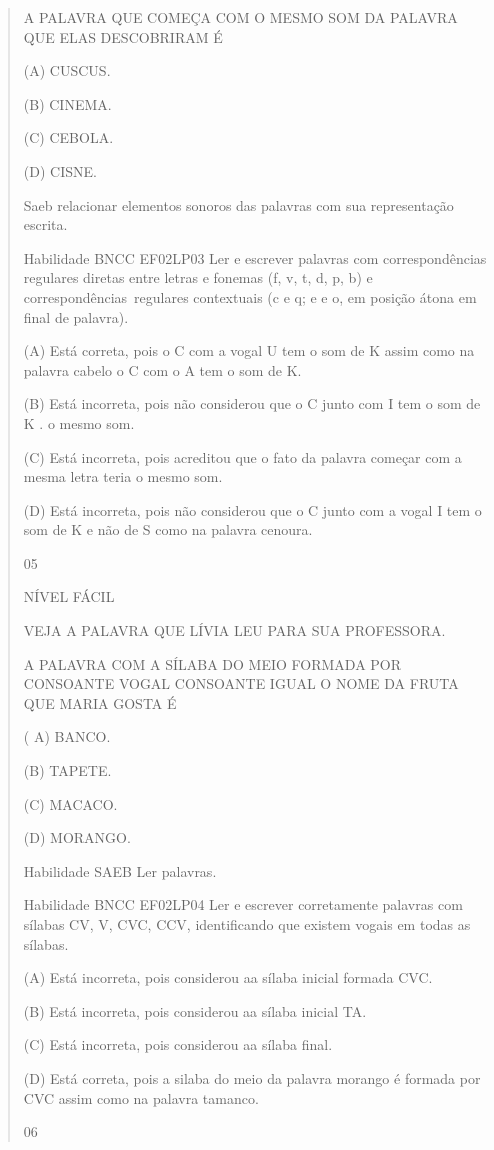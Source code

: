 \begin{verse}
{{{{{{{{{{{{{{{{{{{{A PALAVRA QUE COMEÇA COM O MESMO SOM DA PALAVRA QUE ELAS DESCOBRIRAM É

(A) CUSCUS.

(B) CINEMA.

(C) CEBOLA.

(D) CISNE.

Saeb relacionar elementos sonoros das palavras com sua representação
escrita.

Habilidade BNCC EF02LP03 Ler e escrever palavras com correspondências
regulares diretas entre letras e fonemas (f, v, t, d, p, b) e
correspondências~regulares contextuais (c e q; e e o, em posição átona
em final de palavra).

(A) Está correta, pois o C com a vogal U tem o som de K assim como na
palavra cabelo o C com o A tem o som de K.

(B) Está incorreta, pois não considerou que o C junto com I tem o som de
K . o mesmo som.

(C) Está incorreta, pois acreditou que o fato da palavra começar com a
mesma letra teria o mesmo som.

(D) Está incorreta, pois não considerou que o C junto com a vogal I tem
o som de K e não de S como na palavra cenoura.

\num{05}

NÍVEL FÁCIL

VEJA A PALAVRA QUE LÍVIA LEU PARA SUA PROFESSORA.

A PALAVRA COM A SÍLABA DO MEIO FORMADA POR CONSOANTE VOGAL CONSOANTE
IGUAL O NOME DA FRUTA QUE MARIA GOSTA É

( A) BANCO.

(B) TAPETE.

(C) MACACO.

(D) MORANGO.

Habilidade SAEB Ler palavras.

Habilidade BNCC EF02LP04 Ler e escrever corretamente palavras com
sílabas CV, V, CVC, CCV, identificando que existem vogais em todas as
sílabas.

(A) Está incorreta, pois considerou aa sílaba inicial formada CVC.

(B) Está incorreta, pois considerou aa sílaba inicial TA.

(C) Está incorreta, pois considerou aa sílaba final.

(D) Está correta, pois a silaba do meio da palavra morango é formada por
CVC assim como na palavra tamanco.

\num{06}

}}}}}}}}}}}}}}}}}}}}
\end{verse}
